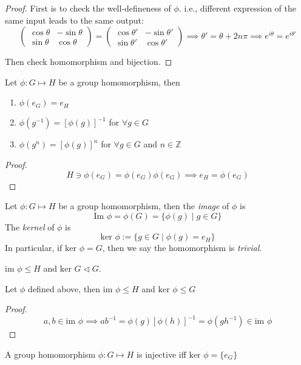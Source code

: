 \begin{proof}
First is to check the well-defineness of $\phi$. i.e., different expression of the same input leads to the same output:
\[
\begin{pmatrix}
\cos\theta&-\sin\theta\\
\sin\theta&\cos\theta
\end{pmatrix}=
\begin{pmatrix}
\cos\theta'&-\sin\theta'\\
\sin\theta'&\cos\theta'
\end{pmatrix}\implies
\theta'=\theta+2n\pi\implies
e^{i\theta}=e^{i\theta'}
\]

Then check homomorphism and bijection.

\end{proof}
\begin{proposition}
Let $\phi:G\mapsto H$ be a group homomorphism, then
\begin{enumerate}
\item
$\phi(e_G)=e_H$
\item
$\phi(g^{-1})=[\phi(g)]^{-1}$ for $\forall g\in G$
\item
$\phi(g^n) = [\phi(g)]^n$ for  $\forall g\in G$ and $n\in\mathbb{Z}$
\end{enumerate}
\end{proposition}
\begin{proof}
\[
H\ni\phi(e_G)=\phi(e_G)\phi(e_G)\implies
e_H=\phi(e_G)
\]
\end{proof}
\begin{definition}[image]
Let $\phi:G\mapsto H$ be a group homomorphism, then the \emph{image} of $\phi$ is
\[
\mbox{Im }\phi=\phi(G)=\{\phi(g)\mid g\in G\}
\]
The \emph{kernel} of $\phi$ is
\[
\mbox{ker }\phi:=\{g\in G\mid \phi(g) = e_H\}
\]
In particular, if $\mbox{ker }\phi=G$, then we say the homomorphism is \emph{trivial}.
\end{definition}
\begin{remark}
$\mbox{im }\phi\le H$ and $\mbox{ker }G\triangleleft G$.
\end{remark}
\begin{proposition}
Let $\phi$ defined above, then $\mbox{im }\phi\le H$ and $\mbox{ker }\phi\le G$
\end{proposition}
\begin{proof}
\[
a,b\in\mbox{im }\phi\implies
ab^{-1}=\phi(g)[\phi(h)]^{-1}=\phi(gh^{-1})\in\mbox{im }\phi
\]
\end{proof}
\begin{proposition}
A group homomorphism $\phi:G\mapsto H$ is injective iff $\mbox{ker }\phi=\{e_G\}$
\end{proposition}

